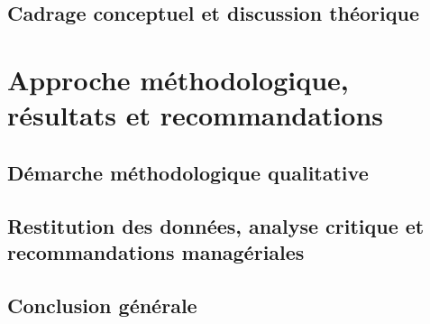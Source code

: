 \documentclass{tnreport}
\begin{document}
\chapter{Cadrage conceptuel et discussion théorique}


\cleardoublepage{}

\part{Approche méthodologique, résultats et recommandations}

\chapter{Démarche méthodologique qualitative}


\chapter{Restitution des données, analyse critique et recommandations managériales}


\cleardoublepage{}

\chapter{Conclusion générale}

\cleardoublepage{}

\renewcommand{\tocbibname}{Bibliographie}
\nocite{*}                        %

\cleardoublepage{}

\listoftables                     %
\cleardoublepage{}

\appendix
\end{document}
